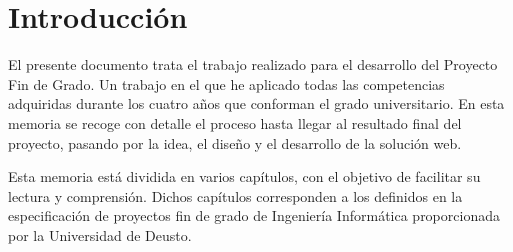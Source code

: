 
\chapter{Introducción}

El presente documento trata el trabajo realizado para el desarrollo del Proyecto Fin de Grado. Un trabajo en el que he aplicado todas las competencias adquiridas durante los cuatro años que conforman el grado universitario. En esta memoria se recoge con detalle el proceso hasta llegar al resultado final del proyecto, pasando por la idea, el diseño y el desarrollo de la solución web.

Esta memoria está dividida en varios capítulos, con el objetivo de facilitar su lectura y comprensión. Dichos capítulos corresponden a los definidos en la especificación de proyectos fin de grado de Ingeniería Informática proporcionada por la Universidad de Deusto.


